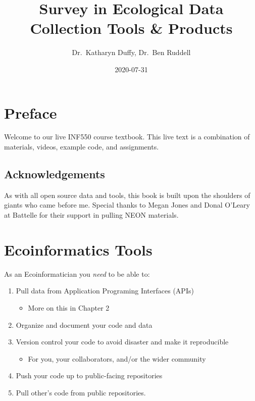 \documentclass[]{book}
\title{Survey in Ecological Data Collection Tools \& Products}
\author{Dr.~Katharyn Duffy, Dr.~Ben Ruddell}
\date{2020-07-31}
\providecommand{\tightlist}{%
  \setlength{\itemsep}{0pt}\setlength{\parskip}{0pt}}
\begin{document}
\maketitle

{
\setcounter{tocdepth}{1}
\tableofcontents
}
\hypertarget{preface}{%
\chapter*{Preface}\label{preface}}

Welcome to our live INF550 course textbook. This live text is a combination of materials, videos, example code, and assignments.

\hypertarget{acknowledgements}{%
\section*{Acknowledgements}\label{acknowledgements}}

As with all open source data and tools, this book is built upon the shoulders of giants who came before me. Special thanks to Megan Jones and Donal O'Leary at Battelle for their support in pulling NEON materials.

\hypertarget{ecoinformatics-tools}{%
\chapter{Ecoinformatics Tools}\label{ecoinformatics-tools}}

As an Ecoinformatician you \emph{need} to be able to:

\begin{enumerate}
\def\labelenumi{\arabic{enumi}.}
\item
  Pull data from Application Programing Interfaces (APIs)

  \begin{itemize}
  \tightlist
  \item
    More on this in Chapter 2
  \end{itemize}
\item
  Organize and document your code and data
\item
  Version control your code to avoid disaster and make it reproducible

  \begin{itemize}
  \tightlist
  \item
    For you, your collaborators, and/or the wider community
  \end{itemize}
\item
  Push your code up to public-facing repositories
\item
  Pull other's code from public repositories.
\end{enumerate}
\end{document}
